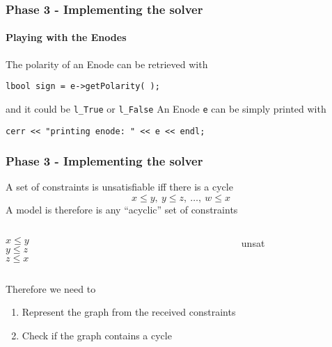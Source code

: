 \begin{frame}[fragile]
  \frametitle{Phase 3 - Implementing the solver}
  \framesubtitle{Playing with the Enodes}

  The polarity of an Enode can be retrieved with
  \begin{center}
  \verb|lbool sign = e->getPolarity( );|
  \end{center}
  and it could be \verb|l_True| or \verb|l_False|
  \vfill
  An Enode \verb|e| can be simply printed with
  \begin{center}
  \verb|cerr << "printing enode: " << e << endl;|
  \end{center}

\end{frame}

\begin{frame}[fragile]
  \frametitle{Phase 3 - Implementing the solver}

  A set of constraints is unsatisfiable iff there is a cycle 
  $$x \leq y,\ y \leq z,\ \ldots,\ w \leq x$$  
  \vfill
  A model is therefore is any ``acyclic'' set of constraints
  \vfill

  \begin{columns}

    \begin{column}{.3\textwidth}

      \begin{overlayarea}{.3\textwidth}{40pt}

	$x \leq y$ \\
	$y \leq z$ \\
	$z \leq x$

      \end{overlayarea}
      
    \end{column}
    
    \begin{column}{.4\textwidth}

      \begin{overlayarea}{.4\textwidth}{40pt}
      
      \end{overlayarea}
      
    \end{column}

    \begin{column}{.2\textwidth}

      unsat

    \end{column}

  \end{columns}

  \vfill
  Therefore we need to

  \begin{enumerate}

    \item Represent the graph from the received constraints

    \item Check if the graph contains a cycle

  \end{enumerate}

\end{frame}

